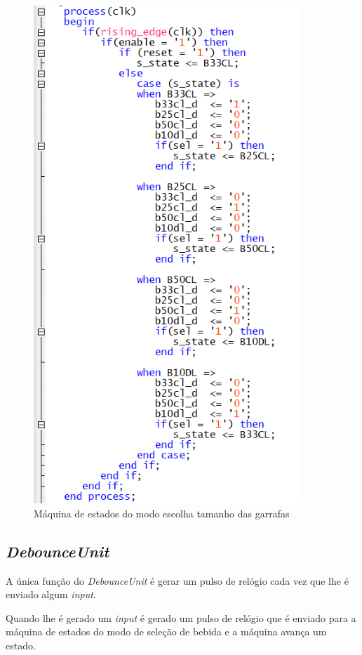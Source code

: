 \documentclass{report}
\begin{document}
\begin{figure}[H]
    \centering
    \includegraphics[width = 10cm]{SelFSM.png}
    \caption{Máquina de estados do modo escolha tamanho das garrafas }
    \label{fig:MEGFSM}
\end{figure}

\subsection{\textit{DebounceUnit}}

A única função do \textit{DebounceUnit} é gerar um pulso de relógio cada vez que lhe é enviado algum \textit{input}.

Quando lhe é gerado um \textit{input} é gerado um pulso de relógio que é enviado para a máquina de estados do modo de seleção de bebida e a máquina avança um estado.
\end{document}
